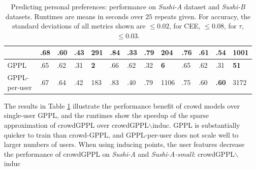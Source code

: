 \begin{table}
\begin{tabularx}{\textwidth}{| p{1.1cm} | X | X | X | p{0.55cm} | X | X | X | p{0.7cm} | X | X | X | p{0.7cm} |}
& .68 & .60 & .43 & 291 %
& .84 & \textbf{.33} & .79 & 204 %
& .76 & .61 & .54 & 1001
\\ 
\hline 
GPPL & .65 & .62 & .31 & \textbf{2} %
& .66 & .62 & .32 & \textbf{6} %
& .65 & .62 & .31 & \textbf{51}
\\
GPPL-per-user & .67 & .64 & .42 & 183 %
& .83 & .40 & .79 & 1106 & .75 & .60 & \textbf{.60} & 3172 %
\\
\hline
\end{tabularx}
\caption{Predicting personal preferences: performance on \emph{Sushi-A} dataset and \emph{Sushi-B} datasets.
Runtimes are means in seconds over $25$ repeats given.
For accuracy, the standard deviations of all metrics shown are $\leq 0.02$, for CEE, $\leq 0.08$, for $\tau$, $\leq 0.03$.
 }
\label{tab:sushi}
\end{table}
The results in Table \ref{tab:sushi} 
illustrate the performance benefit of crowd models over single-user GPPL, and
the runtimes 
show the speedup of the sparse approximation of crowdGPPL over crowdGPPL$\backslash$induc.
GPPL is substantially quicker to train than crowd-GPPL, and GPPL-per-user does not scale well to larger numbers
of users.
 When using inducing points, the user features decrease the performance of crowdGPPL on \emph{Sushi-A} and \emph{Sushi-A-small}: crowdGPPL$\backslash$induc

